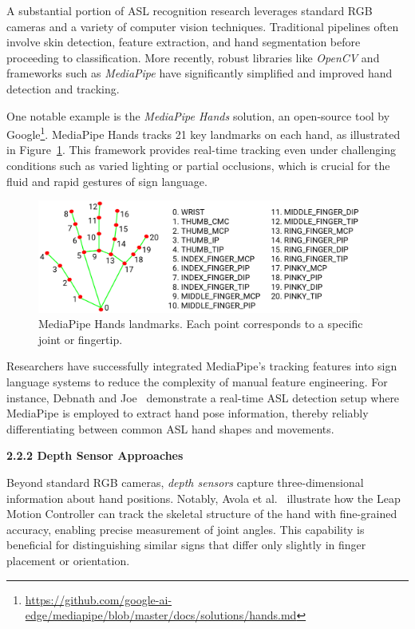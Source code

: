 \documentclass[12pt]{article}
\begin{document}
A substantial portion of ASL recognition research leverages standard RGB cameras and 
a variety of computer vision techniques. Traditional pipelines often involve skin detection, 
feature extraction, and hand segmentation before proceeding to classification. More recently, 
robust libraries like \textit{OpenCV} and frameworks such as \textit{MediaPipe} have significantly simplified 
and improved hand detection and tracking.

One notable example is the \textit{MediaPipe Hands} solution, an open-source tool by Google\footnote{\url{https://github.com/google-ai-edge/mediapipe/blob/master/docs/solutions/hands.md}}. 
MediaPipe Hands tracks 21 key landmarks on each hand, as illustrated in Figure~\ref{fig:mediapipe_hands}. This 
framework provides real-time tracking even under challenging conditions such as varied lighting 
or partial occlusions, which is crucial for the fluid and rapid gestures of sign language.

\begin{figure}[h!]
  \centering
  \includegraphics[width=0.95\textwidth]{MediaPipe_hands.png}
  \caption{MediaPipe Hands landmarks. Each point corresponds to a specific joint or fingertip.}
  \label{fig:mediapipe_hands}
\end{figure}

Researchers have successfully integrated MediaPipe’s tracking features into sign language 
systems to reduce the complexity of manual feature engineering. For instance, Debnath and 
Joe~\cite{ref3} demonstrate a real-time ASL detection setup where MediaPipe is employed to extract 
hand pose information, thereby reliably differentiating between common ASL hand shapes 
and movements.

\vspace{1.0em}
\noindent
\textbf{2.2.2 Depth Sensor Approaches}
\vspace{0.5em}

Beyond standard RGB cameras, \textit{depth sensors} capture three-dimensional information 
about hand positions. Notably, Avola et al.~\cite{ref4} illustrate how the Leap Motion Controller 
can track the skeletal structure of the hand with fine-grained accuracy, enabling precise 
measurement of joint angles. This capability is beneficial for distinguishing 
similar signs that differ only slightly in finger placement or orientation.
\end{document}
